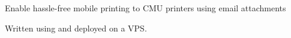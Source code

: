 \documentclass[hidelinks]{deedy-resume-openfont}
\begin{document}
\begin{minipage}[t]{0.66\textwidth}
\descript{}
\begin{tightemize}
\item Enable hassle-free mobile printing to CMU printers using email attachments
\item Written using  and  deployed on a
   VPS.
\end{tightemize}
\sectionsep


%
%






\end{minipage}
\end{document}
